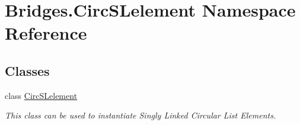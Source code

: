 \hypertarget{namespace_bridges_1_1_circ_s_lelement}{}\section{Bridges.\+Circ\+S\+Lelement Namespace Reference}
\label{namespace_bridges_1_1_circ_s_lelement}
\subsection*{Classes}
\begin{DoxyCompactItemize}
\item 
class \mbox{\hyperlink{class_bridges_1_1_circ_s_lelement_1_1_circ_s_lelement}{Circ\+S\+Lelement}}
\begin{DoxyCompactList}\small\item\em This class can be used to instantiate Singly Linked Circular List Elements. \end{DoxyCompactList}\end{DoxyCompactItemize}
